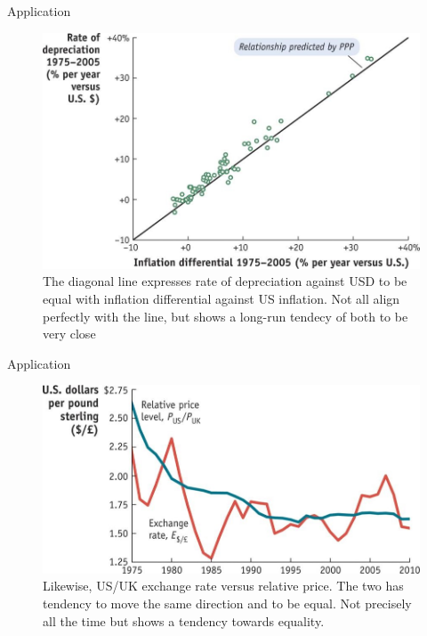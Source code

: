 \documentclass[
  ignorenonframetext,
]{beamer}
\begin{document}
\begin{frame}{Application}
\label{application}
\begin{figure}[H]

{\centering \includegraphics{Picture1.jpg}

}

\caption{The diagonal line expresses rate of depreciation against USD to
be equal with inflation differential against US inflation. Not all align
perfectly with the line, but shows a long-run tendecy of both to be very
close}

\end{figure}%
\end{frame}

\begin{frame}{Application}
\label{application-1}
\begin{figure}[H]

{\centering \includegraphics{Picture2.jpg}

}

\caption{Likewise, US/UK exchange rate versus relative price. The two
has tendency to move the same direction and to be equal. Not precisely
all the time but shows a tendency towards equality.}

\end{figure}%
\end{frame}
\end{document}
